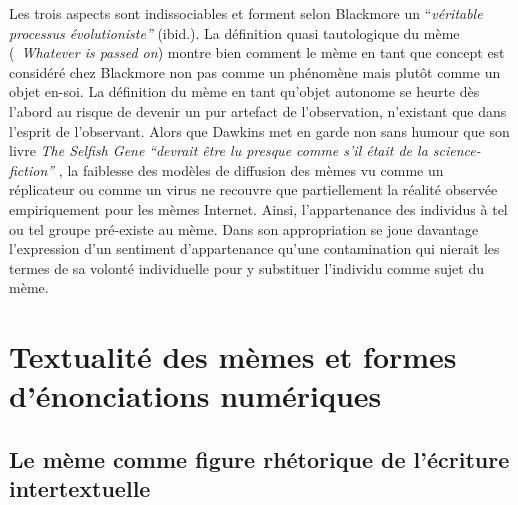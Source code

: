 Les trois aspects sont indissociables et forment selon Blackmore un {\textquotedblleft}\textit{v\'eritable processus \'evolutioniste{\textquotedblright} }(ibid.). La d\'efinition quasi tautologique du m\`eme ({\guillemotleft}~\textit{Whatever is passed on{\guillemotright}}) montre bien comment le m\`eme en tant que concept est consid\'er\'e chez Blackmore non pas comme un ph\'enom\`ene mais plut\^ot comme un objet en-soi. La d\'efinition du m\`eme en tant qu{\textquoteright}objet autonome se heurte d\`es l{\textquoteright}abord au risque de devenir un pur artefact de l{\textquoteright}observation, n{\textquoteright}existant que dans l{\textquoteright}esprit de l{\textquoteright}observant. Alors que Dawkins met en garde non sans humour que son livre \textit{The Selfish Gene} \textit{{\textquotedblleft}devrait \^etre lu presque comme s{\textquoteright}il \'etait de la science-fiction{\textquotedblright} }\citep{Dawkins1984}, la faiblesse des mod\`eles de diffusion des m\`emes vu comme un r\'eplicateur ou comme un virus ne recouvre que partiellement la r\'ealit\'e observ\'ee empiriquement pour les m\`emes Internet. Ainsi, l{\textquoteright}appartenance des individus \`a tel ou tel groupe pr\'e-existe au m\`eme. Dans son appropriation se joue davantage l{\textquoteright}expression d{\textquoteright}un sentiment d{\textquoteright}appartenance qu{\textquoteright}une contamination qui nierait les termes de sa volont\'e individuelle pour y substituer l{\textquoteright}individu comme sujet du m\`eme.  


\section[Textualit\'e des m\`emes et formes d{\textquoteright}\'enonciations num\'eriques]{Textualit\'e des m\`emes et formes d{\textquoteright}\'enonciations num\'eriques}

\subsection[Le m\`eme comme figure rh\'etorique de l{\textquoteright}\'ecriture intertextuelle]{Le m\`eme comme figure rh\'etorique de l{\textquoteright}\'ecriture intertextuelle}

